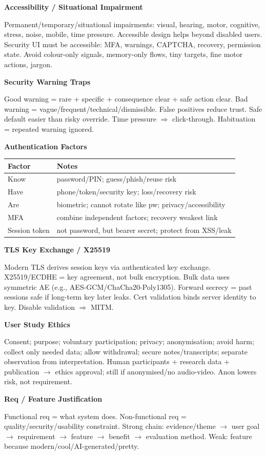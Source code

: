 \documentclass[8pt]{extarticle}
\newcommand{\h}[1]{\vspace{1pt}\textbf{#1}\par}
\begin{document}
\begin{multicols*}{5}
\h{Accessibility / Situational Impairment}
Permanent/temporary/situational impairments: visual, hearing, motor, cognitive, stress, noise, mobile, time pressure. Accessible design helps beyond disabled users. Security UI must be accessible: MFA, warnings, CAPTCHA, recovery, permission state. Avoid colour-only signals, memory-only flows, tiny targets, fine motor actions, jargon.

\h{Security Warning Traps}
Good warning = rare + specific + consequence clear + safe action clear. Bad warning = vague/frequent/technical/dismissible. False positives reduce trust. Safe default easier than risky override. Time pressure $\Rightarrow$ click-through. Habituation = repeated warning ignored.

\h{Authentication Factors}
\begin{tabularx}{\linewidth}{@{}lY@{}}
\toprule
Factor & Notes\\ \midrule
Know & password/PIN; guess/phish/reuse risk\\
Have & phone/token/security key; loss/recovery risk\\
Are & biometric; cannot rotate like pw; privacy/accessibility\\
MFA & combine independent factors; recovery weakest link\\
Session token & not password, but bearer secret; protect from XSS/leak\\
\bottomrule
\end{tabularx}

\h{TLS Key Exchange / X25519}
Modern TLS derives session keys via authenticated key exchange. X25519/ECDHE = key agreement, not bulk encryption. Bulk data uses symmetric AE (e.g., AES-GCM/ChaCha20-Poly1305). Forward secrecy = past sessions safe if long-term key later leaks. Cert validation binds server identity to key. Disable validation $\Rightarrow$ MITM.

\h{User Study Ethics}
Consent; purpose; voluntary participation; privacy; anonymisation; avoid harm; collect only needed data; allow withdrawal; secure notes/transcripts; separate observation from interpretation. Human participants + research data + publication $\to$ ethics approval; still if anonymised/no audio-video. Anon lowers risk, not requirement.

\h{Req / Feature Justification}
Functional req = what system does. Non-functional req = quality/security/usability constraint. Strong chain: evidence/theme $\to$ user goal $\to$ requirement $\to$ feature $\to$ benefit $\to$ evaluation method. Weak: feature because modern/cool/AI-generated/pretty.


\end{multicols*}
\end{document}
